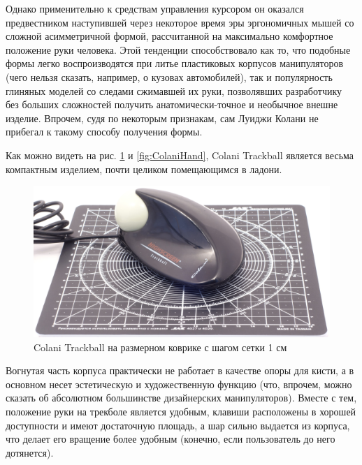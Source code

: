 \documentclass[11pt, a4paper]{article}
\begin{document}
Однако применительно к средствам управления курсором он оказался предвестником наступившей через некоторое время эры эргономичных мышей со сложной асимметричной формой, рассчитанной на максимально комфортное положение руки человека. Этой тенденции способствовало как то, что подобные формы легко воспроизводятся при литье пластиковых корпусов манипуляторов (чего нельзя сказать, например, о кузовах автомобилей), так и популярность глиняных моделей со следами сжимавшей их руки, позволявших разработчику без больших сложностей получить анатомически-точное и необычное внешне изделие. Впрочем, судя по некоторым признакам, сам Луиджи Колани не прибегал к такому способу получения формы.

Как можно видеть на рис. \ref{fig:ColaniSize} и \ref{fig:ColaniHand}, Colani Trackball является весьма компактным изделием, почти целиком помещающимся в ладони.

\begin{figure}[h]
    \centering
    \includegraphics[scale=0.5]{1993_colani_trackball/size_30.jpg}
    \caption{Colani Trackball на размерном коврике с шагом сетки 1 см}
    \label{fig:ColaniSize}
\end{figure}

Вогнутая часть корпуса практически не работает в качестве опоры для кисти, а в основном несет эстетическую и художественную функцию (что, впрочем, можно сказать об абсолютном большинстве дизайнерских манипуляторов). Вместе с тем, положение руки на трекболе является удобным, клавиши расположены в хорошей доступности и имеют достаточную площадь, а шар сильно выдается из корпуса, что делает его вращение более удобным (конечно, если пользователь до него дотянется).
\end{document}
